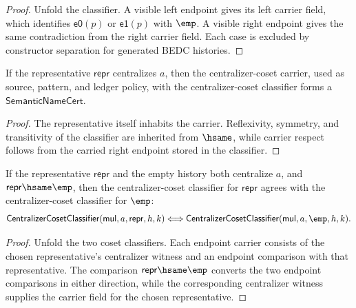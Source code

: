 \begin{proof}
Unfold the classifier. A visible left endpoint gives its left carrier field,
which identifies $\mathsf{e0}(p)$ or $\mathsf{e1}(p)$ with $\emp$. A visible
right endpoint gives the same contradiction from the right carrier field. Each
case is excluded by constructor separation for generated BEDC histories.
\end{proof}
\begin{theorem}
\label{thm:quotientgroup-centralizer-coset-semantic-namecert}
If the representative $\mathsf{repr}$ centralizes $a$, then the
centralizer-coset carrier, used as source, pattern, and ledger policy, with
the centralizer-coset classifier forms a $\mathsf{SemanticNameCert}$.
\end{theorem}
\begin{proof}
The representative itself inhabits the carrier. Reflexivity, symmetry, and
transitivity of the classifier are inherited from $\hsame$, while carrier
respect follows from the carried right endpoint stored in the classifier.
\end{proof}
\begin{theorem}
\label{thm:quotientgroup-centralizer-coset-empty-representative-transport}
If the representative $\mathsf{repr}$ and the empty history both centralize
$a$, and $\mathsf{repr}\hsame\emp$, then the centralizer-coset classifier for
$\mathsf{repr}$ agrees with the centralizer-coset classifier for $\emp$:
$$
\mathsf{CentralizerCosetClassifier}(\mathsf{mul},a,\mathsf{repr},h,k)
\Longleftrightarrow
\mathsf{CentralizerCosetClassifier}(\mathsf{mul},a,\emp,h,k).
$$
\end{theorem}
\begin{proof}
Unfold the two coset classifiers. Each endpoint carrier consists of the chosen
representative's centralizer witness and an endpoint comparison with that
representative. The comparison $\mathsf{repr}\hsame\emp$ converts the two
endpoint comparisons in either direction, while the corresponding centralizer
witness supplies the carrier field for the chosen representative.
\end{proof}

